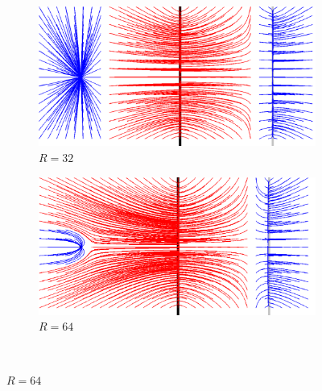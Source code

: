 \begin{figure}[!h]
   \begin{subfigure}[c]{.5\linewidth}
     \centering
     \includegraphics[width=\textwidth]{Chapters/Images/m1_radius_32.png}
     \caption{$R=32$}
   \end{subfigure}   
   \begin{subfigure}[c]{.5\linewidth}
     \centering
     \includegraphics[width=\textwidth]{Chapters/Images/m1_radius_64.png}
     \caption{$R=64$}
   \end{subfigure}\\
   

\end{figure}

